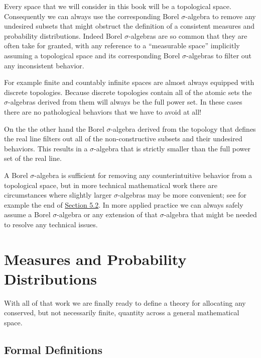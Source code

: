 \documentclass[
  letterpaper,
  DIV=11,
  numbers=noendperiod]{scrartcl}
\begin{document}
Every space that we will consider in this book will be a topological
space. Consequently we can always use the corresponding Borel
\(\sigma\)-algebra to remove any undesired subsets that might obstruct
the definition of a consistent measures and probability distributions.
Indeed Borel \(\sigma\)-algebras are so common that they are often take
for granted, with any reference to a ``measurable space'' implicitly
assuming a topological space and its corresponding Borel
\(\sigma\)-algebras to filter out any inconsistent behavior.

For example finite and countably infinite spaces are almost always
equipped with discrete topologies. Because discrete topologies contain
all of the atomic sets the \(\sigma\)-algebras derived from them will
always be the full power set. In these cases there are no pathological
behaviors that we have to avoid at all!

On the the other hand the Borel \(\sigma\)-algebra derived from the
topology that defines the real line filters out all of the
non-constructive subsets and their undesired behaviors. This results in
a \(\sigma\)-algebra that is strictly smaller than the full power set of
the real line.

A Borel \(\sigma\)-algebra is sufficient for removing any
counterintuitive behavior from a topological space, but in more
technical mathematical work there are circumstances where slightly
larger \(\sigma\)-algebras may be more convenient; see for example the
end of \href{@sec:lebesgue}{Section 5.2}. In more applied practice we
can always safely assume a Borel \(\sigma\)-algebra or any extension of
that \(\sigma\)-algebra that might be needed to resolve any technical
issues.

\hypertarget{measures-and-probability-distributions}{%
\section{Measures and Probability
Distributions}\label{measures-and-probability-distributions}}

With all of that work we are finally ready to define a theory for
allocating any conserved, but not necessarily finite, quantity across a
general mathematical space.

\hypertarget{formal-definitions}{%
\subsection{Formal Definitions}\label{formal-definitions}}
\end{document}
